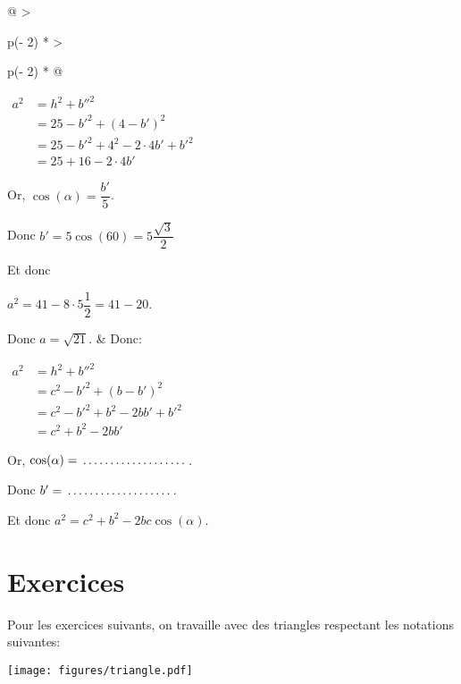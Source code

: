 \documentclass[
  a4paper,
  DIV=11,
  numbers=noendperiod,
  oneside]{scrreprt}
\theoremstyle{definition}
\theoremstyle{definition}
\theoremstyle{plain}
\theoremstyle{definition}
\theoremstyle{remark}
\begin{document}
\begin{longtable}[]{@{}
  >{\raggedright\arraybackslash}p{}
  >{\raggedright\arraybackslash}p{}@{}}
\(
 \begin{aligned}
a^2&=h^2+b''^2\\
&=25-b'^2+(4-b')^2\\
&=25-b'^2+4^2-2\cdot 4b'+b'^2\\
&=25+16-2\cdot 4b'
\end{aligned}
\)

Or, \(\cos(\alpha)=\dfrac{b'}{5}\).

Donc \(b'=5\cos(60)=5\dfrac{\sqrt{3}}{2}\)

Et donc

\(a^2=41-8\cdot 5\dfrac{1}{2}=41-20\).

Donc \(a=\sqrt{21}\). & Donc:

\(
\begin{aligned}
a^2&=h^2+b''^2\\
&=c^2-b'^2+(b-b')^2\\
&=c^2-b'^2+b^2-2bb'+b'^2\\
&=c^2+b^2-2bb'
\end{aligned}
\)

Or, \(\cos(\alpha)=\makebox[3cm]{\dotfill}\).

Donc \(b'=\makebox[3cm]{\dotfill}\).

Et donc \(
a^2=c^2+b^2-2bc\cos(\alpha).
\) \\
\end{longtable}

\section{Exercices}\label{exercices}

Pour les exercices suivants, on travaille avec des triangles respectant
les notations suivantes:

\begin{center}
\texttt{[image: figures/triangle.pdf]}
\end{center}
\end{document}
